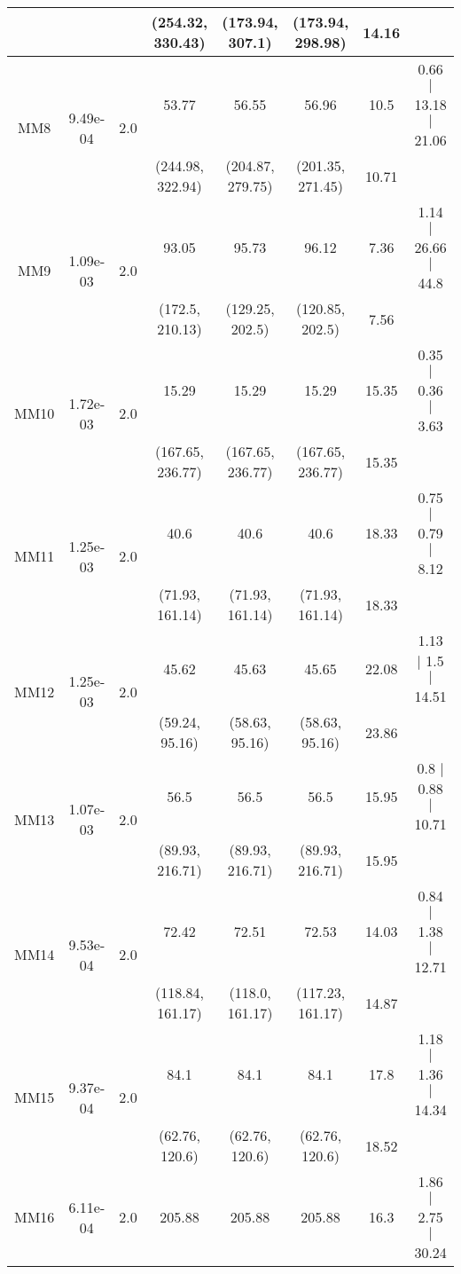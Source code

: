 \begin{longtable}{|c|c|c|c|c|c|c|c|}
	 &  &  & (254.32, 330.43) & (173.94, 307.1) & (173.94, 298.98) & 14.16 & \\
 	\hline
	\multirow{2}{*}{MM8} & \multirow{2}{*}{9.49e-04} & \multirow{2}{*}{2.0} & 53.77 & 56.55 & 56.96 & 10.5 & 0.66 $\mid$ 13.18 $\mid$ 21.06\\
	 &  &  & (244.98, 322.94) & (204.87, 279.75) & (201.35, 271.45) & 10.71 & \\
 	\hline
	\multirow{2}{*}{MM9} & \multirow{2}{*}{1.09e-03} & \multirow{2}{*}{2.0} & 93.05 & 95.73 & 96.12 & 7.36 & 1.14 $\mid$ 26.66 $\mid$ 44.8\\
	 &  &  & (172.5, 210.13) & (129.25, 202.5) & (120.85, 202.5) & 7.56 & \\
 	\hline
	\multirow{2}{*}{MM10} & \multirow{2}{*}{1.72e-03} & \multirow{2}{*}{2.0} & 15.29 & 15.29 & 15.29 & 15.35 & 0.35 $\mid$ 0.36 $\mid$ 3.63\\
	 &  &  & (167.65, 236.77) & (167.65, 236.77) & (167.65, 236.77) & 15.35 & \\
 	\hline
	\multirow{2}{*}{MM11} & \multirow{2}{*}{1.25e-03} & \multirow{2}{*}{2.0} & 40.6 & 40.6 & 40.6 & 18.33 & 0.75 $\mid$ 0.79 $\mid$ 8.12\\
	 &  &  & (71.93, 161.14) & (71.93, 161.14) & (71.93, 161.14) & 18.33 & \\
 	\hline
	\multirow{2}{*}{MM12} & \multirow{2}{*}{1.25e-03} & \multirow{2}{*}{2.0} & 45.62 & 45.63 & 45.65 & 22.08 & 1.13 $\mid$ 1.5 $\mid$ 14.51\\
	 &  &  & (59.24, 95.16) & (58.63, 95.16) & (58.63, 95.16) & 23.86 & \\
 	\hline
	\multirow{2}{*}{MM13} & \multirow{2}{*}{1.07e-03} & \multirow{2}{*}{2.0} & 56.5 & 56.5 & 56.5 & 15.95 & 0.8 $\mid$ 0.88 $\mid$ 10.71\\
	 &  &  & (89.93, 216.71) & (89.93, 216.71) & (89.93, 216.71) & 15.95 & \\
 	\hline
	\multirow{2}{*}{MM14} & \multirow{2}{*}{9.53e-04} & \multirow{2}{*}{2.0} & 72.42 & 72.51 & 72.53 & 14.03 & 0.84 $\mid$ 1.38 $\mid$ 12.71\\
	 &  &  & (118.84, 161.17) & (118.0, 161.17) & (117.23, 161.17) & 14.87 & \\
 	\hline
	\multirow{2}{*}{MM15} & \multirow{2}{*}{9.37e-04} & \multirow{2}{*}{2.0} & 84.1 & 84.1 & 84.1 & 17.8 & 1.18 $\mid$ 1.36 $\mid$ 14.34\\
	 &  &  & (62.76, 120.6) & (62.76, 120.6) & (62.76, 120.6) & 18.52 & \\
 	\hline
	\multirow{2}{*}{MM16} & \multirow{2}{*}{6.11e-04} & \multirow{2}{*}{2.0} & 205.88 & 205.88 & 205.88 & 16.3 & 1.86 $\mid$ 2.75 $\mid$ 30.24\\

\end{longtable}
